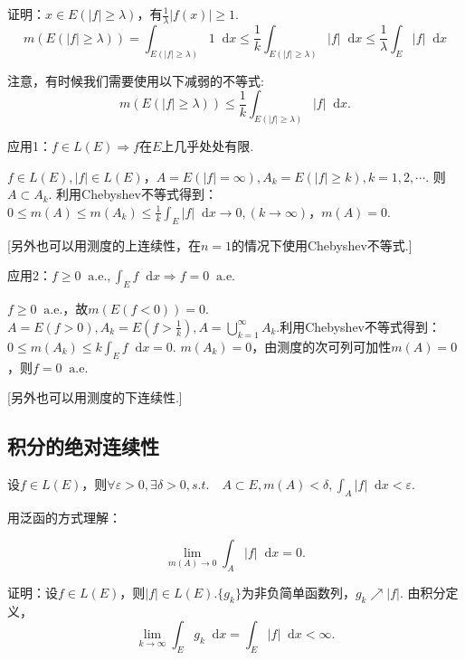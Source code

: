 \documentclass[bwprint, withoutpreface]{cumcmthesis}
\newcommand*{\dif}{\mathop{}\!\mathrm{d}}
\begin{document}
证明：$x \in E(|f| \geqslant \lambda)$，有$\frac{1}{\lambda}|f(x)| \geqslant 1$.
\begin{equation*}
	m(E(|f| \geqslant \lambda)) = \int_{E(|f| \geqslant \lambda)} 1 \dif x \leqslant \frac{1}{k}\int_{E(|f| \geqslant \lambda)} |f| \dif x \leqslant \frac{1}{\lambda} \int_E |f| \dif x
\end{equation*}

注意，有时候我们需要使用以下减弱的不等式:
\begin{equation*}
	m(E(|f| \geqslant \lambda)) \leqslant \frac{1}{k}\int_{E(|f| \geqslant \lambda)} |f| \dif x.
\end{equation*}

应用1：$f \in L(E) \Rightarrow f$在$E$上几乎处处有限.

$f \in L(E), |f| \in L(E)$，$A = E(|f| = \infty), A_k = E(|f| \geqslant k), k = 1, 2, \cdots$. 则$A \subset A_k$. 利用Chebyshev不等式得到：$0 \leqslant m(A) \leqslant m(A_k) \leqslant \frac{1}{k} \int_E |f| \dif x \to 0, (k \to \infty)$，$m(A) = 0$.

[另外也可以用测度的上连续性，在$n = 1$的情况下使用Chebyshev不等式.]

应用2：$f \geqslant 0 \mathop{} \! \mathrm{a.e.}, \int_E f \dif x \Rightarrow f = 0 \mathop{} \! \mathrm{a.e.}$

$f \geqslant 0 \mathop{} \! \mathrm{a.e.}$，故$m(E(f < 0)) = 0$.$A = E(f > 0), A_k = E(f > \frac{1}{k}), A = \bigcup_{k = 1}^{\infty}{A_k}$.利用Chebyshev不等式得到：$0 \leqslant m(A_k) \leqslant k \int_E f \dif x = 0$. $m(A_k) = 0$，由测度的次可列可加性$m(A) = 0$，则$f = 0 \mathop{} \! \mathrm{a.e.}$

[另外也可以用测度的下连续性.]

\subsection{积分的绝对连续性}
设$f \in L(E)$，则$\forall \varepsilon > 0, \exists \delta > 0, s.t. \quad A \subset E, m(A) < \delta, \int_A |f| \dif x < \varepsilon.$

用泛函的方式理解：

\begin{equation*}
	\lim_{m(A) \to 0}{\int_A |f| \dif x = 0}.
\end{equation*}

证明：设$f \in L(E)$，则$|f| \in L(E)$.$\{g_k\}$为非负简单函数列，$g_k \nearrow |f|$. 由积分定义，
\begin{equation*}
	\lim_{k \to \infty} \int_E g_k \dif x = \int_E |f| \dif x < \infty.
\end{equation*}
\end{document}
